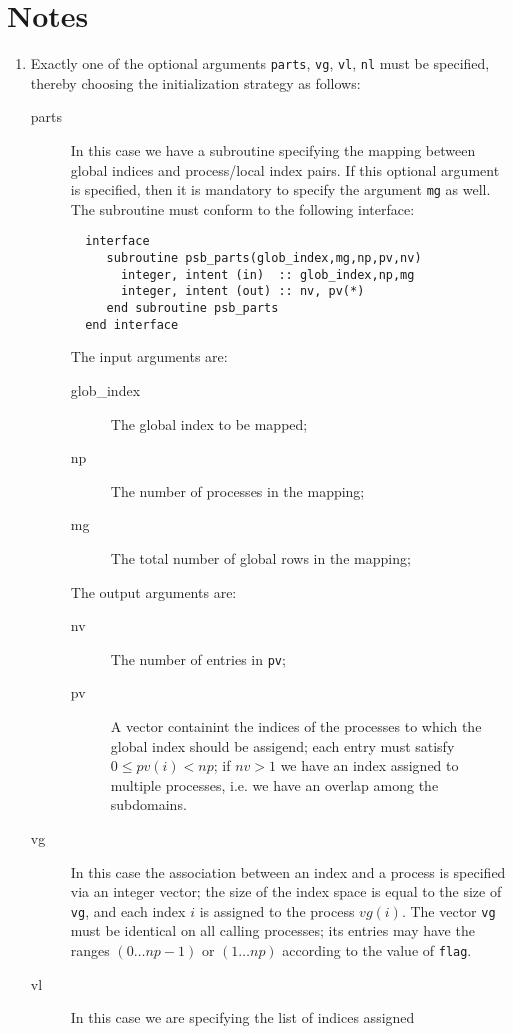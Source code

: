 \section*{Notes}
\begin{enumerate}
\item Exactly one of the optional arguments  \verb|parts|, \verb|vg|,
  \verb|vl|, \verb|nl|  must be specified, thereby choosing the
  initialization   strategy as follows:
\begin{description}
\item[parts] In this case we have a subroutine specifying the mapping
  between global indices and process/local index pairs. If this
  optional argument   is specified, then it is mandatory to 
  specify the argument \verb|mg| as well.  
  The subroutine must conform to the following interface: 
\begin{verbatim}
  interface 
     subroutine psb_parts(glob_index,mg,np,pv,nv)
       integer, intent (in)  :: glob_index,np,mg
       integer, intent (out) :: nv, pv(*)
     end subroutine psb_parts
  end interface
\end{verbatim}
  The input arguments are:
  \begin{description}
    \item[glob\_index] The global index to be mapped;
    \item[np] The number of processes in the mapping;
    \item[mg] The total number of global rows in the mapping;
  \end{description}
  The output arguments are:
  \begin{description}
    \item[nv] The number of entries in \verb|pv|;
    \item[pv] A vector containint the indices of the processes to
    which the global index should be assigend; each entry must satisfy
    $0\le pv(i) < np$; if $nv>1$ we have an index assigned to multiple
    processes, i.e. we have an overlap among the subdomains.
  \end{description}
\item[vg] In this case the association between an index and a process
  is specified via an integer vector; the size of the index space is
  equal to the size of \verb|vg|, and each index $i$ is assigned to
  the process $vg(i)$. The vector \verb|vg| must be identical on all
  calling processes; its entries may have the ranges $(0\dots np-1)$
  or $(1\dots np)$ according to the value of \verb|flag|.
\item[vl] In this case we are specifying the list of indices assigned

\end{description}
\end{enumerate}
